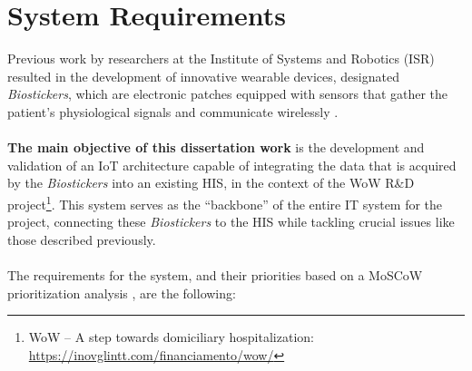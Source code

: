 
\section{System Requirements}

Previous work by researchers at the Institute of Systems and Robotics (ISR) resulted in the development of innovative wearable devices, designated \textit{Biostickers}, which are electronic patches equipped with sensors that gather the patient's physiological signals and communicate wirelessly \cite{Silva2020}. 


\paragraph{} \textbf{The main objective of this dissertation work} is the development and validation of an \acs{IoT} architecture capable of integrating the data that is acquired by the \textit{Biostickers} into an existing \acs{HIS}, in the context of the \acs{WoW} R\&D project\footnote{WoW -- A step towards domiciliary hospitalization: \url{https://inovglintt.com/financiamento/wow/}}. This system serves as the ``backbone'' of the entire \acf{IT} system for the project, connecting these \textit{Biostickers} to the \acs{HIS} while tackling crucial issues like those described previously.


\paragraph{} The requirements for the system, and their priorities based on a MoSCoW prioritization analysis \cite{stapleton1997dsdm}, are the following: 


